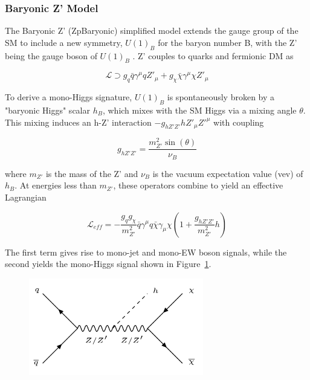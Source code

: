 \subsubsection{Baryonic Z' Model}

The Baryonic Z' (ZpBaryonic) simplified model extends the gauge group of the SM to include a new symmetry, $U(1)_B$ for the baryon number B, with the Z' being the gauge boson of $U(1)_B$ \cite{Carone:1994aa, Agashe:2004bm, FileviezPerez:2010gw}. Z' couples to quarks and fermionic DM as

\begin{equation}
\mathcal{L} \supset g_q \bar{q} \gamma^\mu q Z'_\mu + g_\chi \bar{\chi} \gamma^\mu \chi Z'_\mu
\end{equation}

To derive a mono-Higgs signature, $U(1)_B$ is spontaneously broken by a "baryonic Higgs" scalar $h_B$, which mixes with the SM Higgs via a mixing angle $\theta$. This mixing induces an h-Z' interaction $-g_{hZ'Z'} h Z'_\mu Z'^\mu$ with coupling

\begin{equation}
g_{hZ'Z'} = \frac{m_{Z'}^2 \sin(\theta)}{\nu_B}
\end{equation}

where $m_{Z'}$ is the mass of the Z' and $\nu_B$ is the vacuum expectation value (vev) of $h_B$. At energies less than $m_{Z'}$, these operators combine to yield an effective Lagrangian

\begin{equation}
\mathcal{L}_{eff} = -\frac{g_q g_\chi}{m_{Z'}^2} \bar{q} \gamma^\mu q \bar{\chi} \gamma_\mu \chi (1 + \frac{g_{hZ'Z'}}{m_{Z'}^2} h)
\end{equation}

The first term gives rise to mono-jet and mono-EW boson signals, while the second yields the mono-Higgs signal shown in Figure~\ref{fig:zpsig}.

\begin{figure}[tbh]
\centering
\includegraphics[width=3in]{figures/zpsig.png}
\caption{}
\label{fig:zpsig}
\end{figure}

